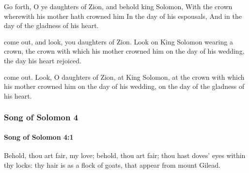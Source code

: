 			\begin{versebox}
					\item[BHS] 
					\item[LXX] 
					\item[ASV] Go forth, O ye daughters of Zion, and behold king Solomon, With the crown wherewith his mother hath crowned him In the day of his espousals, And in the day of the gladness of his heart.
					\item[NIV] come out, and look, you daughters of Zion. Look on King Solomon wearing a crown, the crown with which his mother crowned him on the day of his wedding, the day his heart rejoiced.
					\item[NRSV] come out. Look, O daughters of Zion, at King Solomon, at the crown with which his mother crowned him on the day of his wedding, on the day of the gladness of his heart.
			\end{versebox}
	\subsubsection{Song of Solomon 4} %
		\label{SONGOFSOLOMON-4}

		\paragraph{Song of Solomon 4:1} %
			\label{SONGOFSOLOMON-4-1}

			Behold, thou art fair, my love; behold, thou art fair; thou hast doves’ eyes within thy locks: thy hair is as a flock of goats, that appear from mount Gilead.

